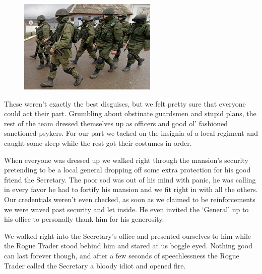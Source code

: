 \begin{figure}
\begin{center}
	\includegraphics[width=\figwidth]{pics/3/23.png}
\end{center}
\end{figure}
These weren’t exactly the best disguises, but we felt pretty sure that everyone could act their part. 
Grumbling about obstinate guardsmen and stupid plans, the rest of the team dressed themselves up as officers and good ol’ fashioned sanctioned psykers. 
For our part we tacked on the insignia of a local regiment and caught some sleep while the rest got their costumes in order. 

When everyone was dressed up we walked right through the mansion’s security pretending to be a local general dropping off some extra protection for his good friend the Secretary. 
The poor sod was out of his mind with panic, he was calling in every favor he had to fortify his mansion and we fit right in with all the others. Our credentials weren’t even checked, as soon as we claimed to be reinforcements we were waved past security and let inside. 
He even invited the ‘General’ up to his office to personally thank him for his generosity. 

We walked right into the Secretary’s office and presented ourselves to him while the Rogue Trader stood behind him and stared at us boggle eyed. 
Nothing good can last forever though, and after a few seconds of speechlessness the Rogue Trader called the Secretary a bloody idiot and opened fire.

